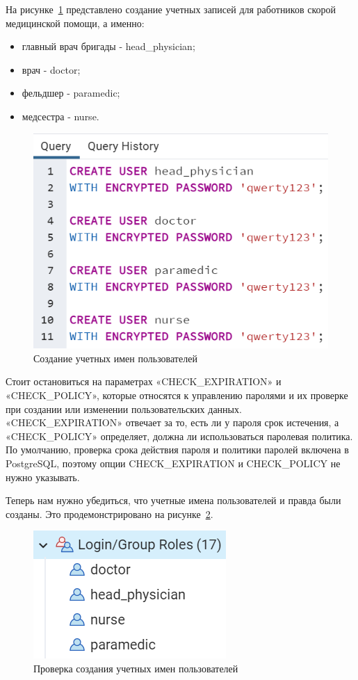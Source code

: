На рисунке~\ref{fig:fig09} представлено создание учетных записей для работников скорой медицинской помощи, а именно:

\begin{itemize}
    \item главный врач бригады - head\_physician;
    \item врач - doctor;
    \item фельдшер - paramedic;
    \item медсестра - nurse.
\end{itemize}

\begin{figure}
  \includegraphics[scale=0.8]{inc/usernames}
  \caption{Создание учетных имен пользователей}
  \label{fig:fig09}
\end{figure}

Стоит остановиться на параметрах «CHECK\_EXPIRATION» и «CHECK\_POLICY», которые относятся к управлению паролями и их проверке при создании или изменении пользовательских данных. «CHECK\_EXPIRATION» отвечает за то, есть ли у пароля срок истечения, а «CHECK\_POLICY» определяет, должна ли использоваться паролевая политика. По умолчанию, проверка срока действия пароля и политики паролей включена в PostgreSQL, поэтому опции CHECK\_EXPIRATION и CHECK\_POLICY не нужно указывать.

Теперь нам нужно убедиться, что учетные имена пользователей и правда были созданы. Это продемонстрировано на рисунке~\ref{fig:fig10}.

\begin{figure}
  \includegraphics[scale=1]{inc/check_usernames}
  \caption{Проверка создания учетных имен пользователей}
  \label{fig:fig10}
\end{figure}

